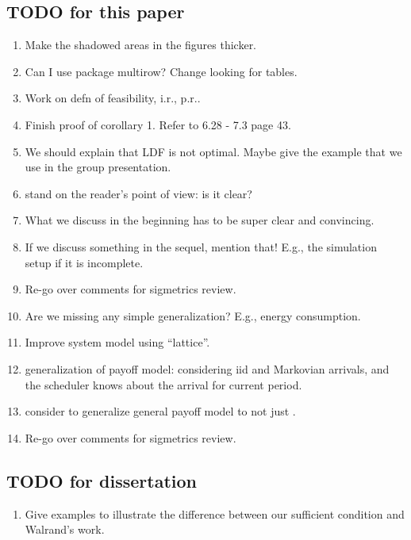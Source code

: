 \documentclass[prodmode,acmtompecs]{acmsmall}
\newcommand{\myComments}[1]{}
\newcommand{\commentEnd}{\myComments{End}}
\begin{document}
\subsection{TODO for this paper}
\begin{enumerate}
\item Make the shadowed areas in the figures thicker. 
\item Can I use package multirow? Change looking for tables. 
\item Work on defn of feasibility, i.r., p.r.. 
\item Finish proof of corollary 1. Refer to 6.28 - 7.3 page 43. 
\item We should explain that LDF is not optimal. Maybe give the example that we use in the group presentation. 
\item stand on the reader's point of view: is it clear? 
\item What we discuss in the beginning has to be super clear and convincing. 
\item If we discuss something in the sequel, mention that! E.g., the simulation setup if it is incomplete. 
\item Re-go over comments for sigmetrics review. 
\item Are we missing any simple generalization? E.g., energy consumption. 
\item Improve system model using ``lattice''. 
\item generalization of payoff model: considering iid and Markovian arrivals, and the scheduler knows about the arrival for current period. 
\item consider to generalize general payoff model to  not just . 
\item Re-go over comments for sigmetrics review. 
\end{enumerate}

\subsection{TODO for dissertation}
\begin{enumerate}
\item Give examples to illustrate the difference between our sufficient condition and Walrand's work. 
\end{enumerate}
\commentEnd\fi
\end{document}
